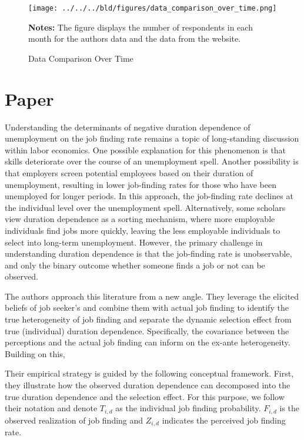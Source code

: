 \documentclass[11pt,a4paper,leqno]{article}
\begin{document}
\begin{figure}[!htbp] \centering
	\texttt{[image: ../../../bld/figures/data\_comparison\_over\_time.png]}
	\begin{minipage}[center]{0.75\textwidth}
		\caption*{\footnotesize \textbf{Notes:} The figure displays the number of respondents in each month for the authors data and the data from the website.}
	\end{minipage}
  \caption{Data Comparison Over Time}
\label{fig:comp_over_time}
\end{figure}

\section{Paper} \label{sec:paper}

Understanding the determinants of negative duration dependence of unemployment on the job finding rate remains a topic of long-standing discussion within labor economics.  One possible explanation for this phenomenon is that skills deteriorate over the course of an unemployment spell. Another possibility is that employers screen potential employees based on their duration of unemployment, resulting in lower job-finding rates for those who have been unemployed for longer periods. In this approach, the job-finding rate declines at the individual level over the unemployment spell. Alternatively, some scholars view duration dependence as a sorting mechanism, where more employable individuals find jobs more quickly, leaving the less employable individuals to select into long-term unemployment. However, the primary challenge in understanding duration dependence is that the job-finding rate is unobservable, and only the binary outcome whether someone finds a job or not can be observed. 

The authors approach this literature from a new angle. They leverage the elicited beliefs of job seeker's and combine them with actual job finding to identify the true heterogeneity of job finding and separate the dynamic selection effect from true (individual) duration dependence. Specifically, the covariance between the perceptions and the actual job finding can inform on the ex-ante heterogeneity. Building on this,

Their empirical strategy is guided by the following conceptual framework. First, they illustrate how the observed duration dependence can decomposed into the true duration dependence and the selection effect. For this purpose, we follow their notation and denote $T_{i,d}$ as the individual job finding probability. $F_{i,d}$ is the observed realization of job finding and $Z_{i,d}$ indicates the perceived job finding rate.
\end{document}
